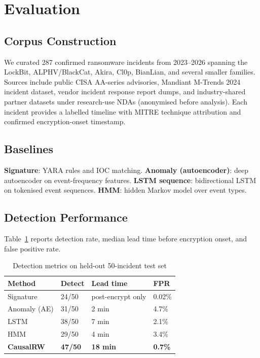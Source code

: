 \documentclass[sigconf,nonacm]{acmart}
\begin{document}
\section{Evaluation}

\subsection{Corpus Construction}

We curated 287 confirmed ransomware incidents from 2023--2026
spanning the LockBit, ALPHV/BlackCat, Akira, Cl0p, BianLian, and
several smaller families. Sources include public CISA AA-series
advisories, Mandiant M-Trends 2024 incident dataset, vendor incident
response report dumps, and industry-shared partner datasets under
research-use NDAs (anonymised before analysis). Each incident
provides a labelled timeline with MITRE technique attribution and
confirmed encryption-onset timestamp.

\subsection{Baselines}

\textbf{Signature}: YARA rules and IOC matching.
\textbf{Anomaly (autoencoder)}: deep autoencoder on event-frequency
features.
\textbf{LSTM sequence}: bidirectional LSTM on tokenised event
sequences.
\textbf{HMM}: hidden Markov model over event types.

\subsection{Detection Performance}

Table~\ref{tab:detection} reports detection rate, median lead time
before encryption onset, and false positive rate.

\begin{table}[h]
\caption{Detection metrics on held-out 50-incident test set}
\label{tab:detection}
\small
\begin{tabularx}{\columnwidth}{@{}p{2.4cm}X X X@{}}
\toprule
\textbf{Method} & \textbf{Detect} & \textbf{Lead time} & \textbf{FPR} \\
\midrule
Signature        & 24/50 & post-encrypt only & 0.02\% \\
Anomaly (AE)     & 31/50 & 2 min  & 4.7\% \\
LSTM             & 38/50 & 7 min  & 2.1\% \\
HMM              & 29/50 & 4 min  & 3.4\% \\
\textbf{CausalRW}& \textbf{47/50} & \textbf{18 min} & \textbf{0.7\%} \\
\bottomrule
\end{tabularx}
\end{table}
\end{document}
